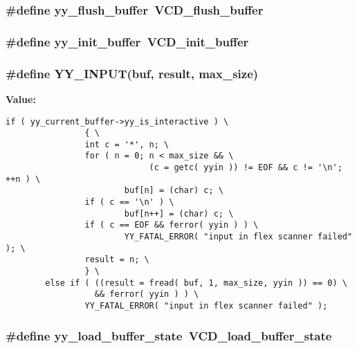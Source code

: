 \subsubsection{\setlength{\rightskip}{0pt plus 5cm}\#define yy\_\-flush\_\-buffer\ VCD\_\-flush\_\-buffer}\label{vcd__lexer_8c_a7}


\subsubsection{\setlength{\rightskip}{0pt plus 5cm}\#define yy\_\-init\_\-buffer\ VCD\_\-init\_\-buffer}\label{vcd__lexer_8c_a6}


\subsubsection{\setlength{\rightskip}{0pt plus 5cm}\#define YY\_\-INPUT(buf, result, max\_\-size)}\label{vcd__lexer_8c_a64}


{\bf Value:}

\footnotesize\begin{verbatim}if ( yy_current_buffer->yy_is_interactive ) \
                { \
                int c = '*', n; \
                for ( n = 0; n < max_size && \
                             (c = getc( yyin )) != EOF && c != '\n'; ++n ) \
                        buf[n] = (char) c; \
                if ( c == '\n' ) \
                        buf[n++] = (char) c; \
                if ( c == EOF && ferror( yyin ) ) \
                        YY_FATAL_ERROR( "input in flex scanner failed" ); \
                result = n; \
                } \
        else if ( ((result = fread( buf, 1, max_size, yyin )) == 0) \
                  && ferror( yyin ) ) \
                YY_FATAL_ERROR( "input in flex scanner failed" );\end{verbatim}\normalsize 
{}
\subsubsection{\setlength{\rightskip}{0pt plus 5cm}\#define yy\_\-load\_\-buffer\_\-state\ VCD\_\-load\_\-buffer\_\-state}\label{vcd__lexer_8c_a8}


